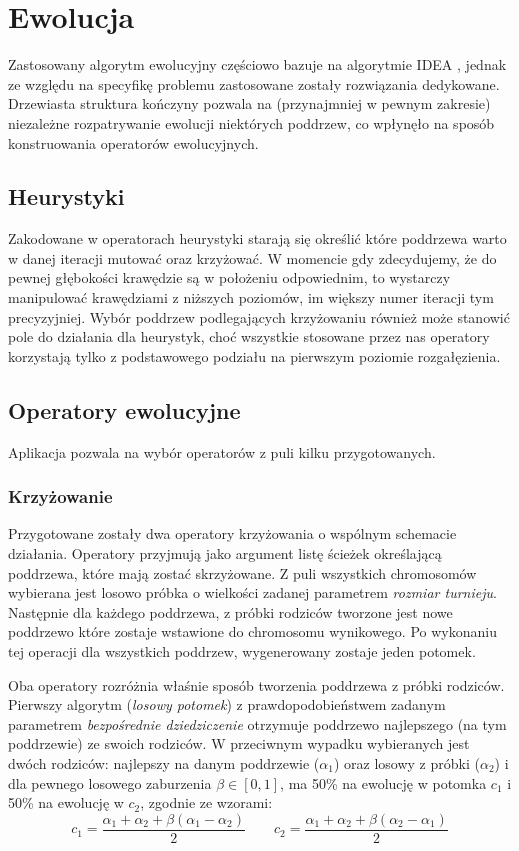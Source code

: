 \documentclass[11pt, leqno]{article}
\renewcommand{\i}[1]{\textit{#1}}
\begin{document}
\section{Ewolucja}
Zastosowany algorytm ewolucyjny częściowo bazuje na algorytmie IDEA \cite{PFI}, jednak ze względu na specyfikę problemu zastosowane zostały rozwiązania dedykowane. Drzewiasta struktura kończyny pozwala na (przynajmniej w pewnym zakresie) niezależne rozpatrywanie ewolucji niektórych poddrzew, co wpłynęło na sposób konstruowania operatorów ewolucyjnych.

\subsection{Heurystyki}
Zakodowane w operatorach heurystyki starają się określić które poddrzewa warto w danej iteracji mutować oraz krzyżować. W momencie gdy zdecydujemy, że do pewnej głębokości krawędzie są w położeniu odpowiednim, to wystarczy manipulować krawędziami z niższych poziomów, im większy numer iteracji tym precyzyjniej. Wybór poddrzew podlegających krzyżowaniu również może stanowić pole do działania dla heurystyk, choć wszystkie stosowane przez nas operatory korzystają tylko z podstawowego podziału na pierwszym poziomie rozgałęzienia.

\subsection{Operatory ewolucyjne}
Aplikacja pozwala na wybór operatorów z puli kilku przygotowanych.

\subsubsection{Krzyżowanie}
Przygotowane zostały dwa operatory krzyżowania o wspólnym schemacie działania. Operatory przyjmują jako argument listę ścieżek określającą poddrzewa, które mają zostać skrzyżowane. Z puli wszystkich chromosomów wybierana jest losowo próbka o wielkości zadanej parametrem \i{rozmiar turnieju}. Następnie dla każdego poddrzewa, z próbki rodziców tworzone jest nowe poddrzewo które zostaje wstawione do chromosomu wynikowego. Po wykonaniu tej operacji dla wszystkich poddrzew, wygenerowany zostaje jeden potomek.

Oba operatory rozróżnia właśnie sposób tworzenia poddrzewa z próbki rodziców. Pierwszy algorytm (\i{losowy potomek}) z prawdopodobieństwem zadanym parametrem \i{bezpośrednie dziedziczenie} otrzymuje poddrzewo najlepszego (na tym poddrzewie) ze swoich rodziców. W przeciwnym wypadku wybieranych jest dwóch rodziców: najlepszy na danym poddrzewie ($\alpha_1$) oraz losowy z próbki ($\alpha_2$) i dla pewnego losowego zaburzenia $\beta\in[0, 1]$, ma 50\% na ewolucję w potomka $c_1$ i 50\% na ewolucję w $c_2$, zgodnie ze wzorami:
	\[
		c_1 = \frac{\alpha_1 + \alpha_2 + \beta(\alpha_1 - \alpha_2)}{2} \quad\quad c_2 = \frac{\alpha_1 + \alpha_2 + \beta(\alpha_2 - \alpha_1)}{2}
	\]
\end{document}
